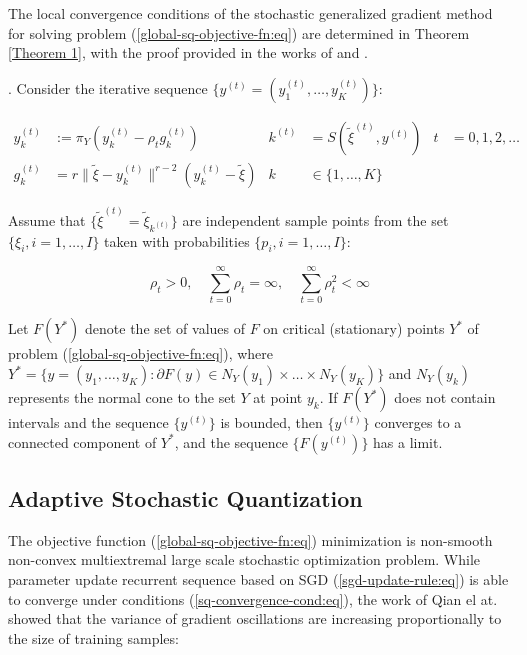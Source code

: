 The local convergence conditions of the stochastic generalized gradient method for solving problem (\ref{global-sq-objective-fn:eq}) are determined in Theorem \ref{Theorem 1}, with the proof provided in the works of \cite{Ermoliev_Norkin_2003} and \cite{Ermolev_Norkin_1998}.

\begin{theorem}
    \label{Theorem 1} \cite{Ermoliev_Norkin_2003,Ermolev_Norkin_1998}. Consider the iterative sequence $ \{ y^{(t)} = (y_1^{(t)}, \ldots, y_K^{(t)}) \} $:

    \begin{align}
        \label{sq-iter:eq}
            y_k^{(t)} &:= \pi_Y (y_k^{(t)} - \rho_t g_k^{(t)}) & k^{(t)} &= S(\tilde{\xi}^{(t)}, y^{(t)}) & t &= 0, 1, 2, \ldots \nonumber \\
            g_k^{(t)} &= r \| \tilde{\xi} - y_k^{(t)} \|^{r - 2} (y_k^{(t)} - \tilde{\xi}) & k &\in \{ 1, \ldots, K \}
    \end{align}

    Assume that $ \{ \tilde{\xi}^{(t)} = \tilde{\xi}_{k^{(t)}} \} $ are independent sample points from the set $ \{ \xi_i, i = 1, \ldots, I \} $ taken with probabilities $ \{ p_i, i = 1, \ldots, I \} $:

    \begin{equation}
        \label{sq-convergence-cond:eq}
            \rho_t > 0, \quad \sum_{t=0}^{\infty} \rho_t = \infty, \quad \sum_{t=0}^{\infty} \rho_t^2 < \infty
    \end{equation}

    Let $ F(Y^*) $ denote the set of values of $ F $ on critical (stationary) points $ Y^* $ of problem (\ref{global-sq-objective-fn:eq}), where $ Y^* = \{ y = (y_1, \ldots, y_K): \partial F(y) \in N_Y (y_1) \times \ldots \times N_Y (y_K) \} $ and $ N_Y (y_k) $ represents the normal cone to the set $ Y $ at point $ y_k $. If $ F(Y^*) $ does not contain intervals and the sequence $ \{ y^{(t)} \} $ is bounded, then $ \{ y^{(t)} \} $ converges to a connected component of $ Y^* $, and the sequence $ \{ F(y^{(t)}) \} $ has a limit.
\end{theorem}

\subsection{Adaptive Stochastic Quantization}

The objective function (\ref{global-sq-objective-fn:eq}) minimization is non-smooth non-convex multiextremal large scale stochastic optimization problem. While parameter update recurrent sequence based on SGD (\ref{sgd-update-rule:eq}) is able to converge under conditions (\ref{sq-convergence-cond:eq}), the work of Qian el at. \cite{qian2020} showed that the variance of gradient oscillations are increasing proportionally to the size of training samples:

